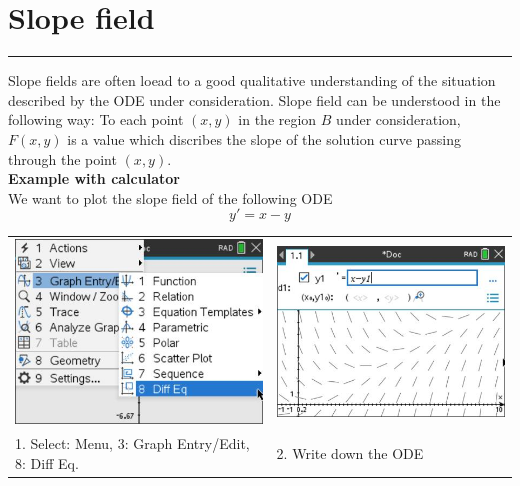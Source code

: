 \section{Slope field}
\noindent\rule[\linienAbstand]{\linewidth}{\linienDickeDick}
Slope fields are often loead to a good qualitative understanding of the situation described by the ODE under consideration.
Slope field can be understood in the following way: To each point $(x, y)$ in the region $B$ under consideration, $F(x, y)$ is a value which discribes the slope of the solution curve passing through the point $(x, y)$.\\

\textbf{Example with calculator}\\
We want to plot the slope field of the following ODE
\begin{equation}
  y' = x - y
\end{equation}
\begin{table}[H]
  \setlength{\tabcolsep}{0.2em}
  \footnotesize
  \begin{tabular}{p{}@{\hskip 1em}p{}}
    \includegraphics[width=\linewidth]{Pics/1.5.1.jpg} & \includegraphics[width=\linewidth]{Pics/1.5.2.jpg} \\
    1. Select: Menu, 3: Graph Entry/Edit, 8: Diff Eq. & 2. Write down the ODE
  \end{tabular}
\end{table}
